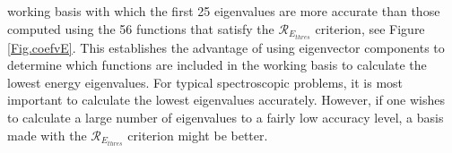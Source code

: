 %
working basis 
with which the first 25 eigenvalues are 
 more accurate than those computed using  the 56 
functions that satisfy the $\mathcal{R}_{E_{thres}} $ criterion,  
  see Figure \ref{Fig.coefvE}. 
This establishes the advantage of using eigenvector components to determine which functions are 
included in the working basis  
%
to calculate the lowest energy eigenvalues.
For typical  spectroscopic problems, it is most important to calculate the lowest eigenvalues accurately.  However, if one wishes  to calculate a large number of eigenvalues 
to a fairly low accuracy level, a basis made with  the $\mathcal{R}_{E_{thres}}$ criterion might be better.  



  





